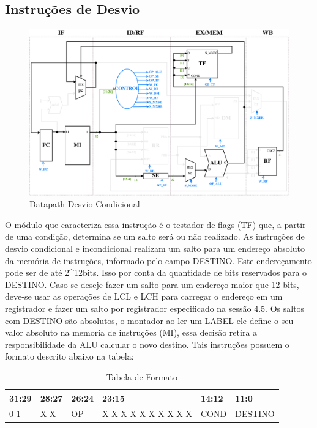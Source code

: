 \documentclass{report}
\begin{document}
\subsection{Instruções de Desvio}
\begin{figure}[H]
\centering
\includegraphics[width=\textwidth]{./pictures/DatapathDES.pdf}
\caption{Datapath Desvio Condicional}
\end{figure}
O módulo que caracteriza essa instrução é o testador de flags (TF) que, a partir de uma condição, determina se um salto será ou não realizado.
As instruções de desvio condicional e incondicional realizam um salto para um endereço absoluto da memória de instruções, informado pelo campo DESTINO. Este endereçamento pode ser de até 2\^{}12bits. Isso por conta da quantidade de bits reservados para o DESTINO. Caso se deseje fazer um salto para um endereço maior que 12 bits, deve-se usar as operações de LCL e LCH para carregar o endereço em um registrador e fazer um salto por registrador especificado na sessão 4.5.
Os saltos com DESTINO são absolutos, o montador ao ler um LABEL ele define o seu valor absoluto na memoria de instruções (MI), essa decisão retira a responsibilidade da ALU calcular o novo destino.
\newline
Tais instruções possuem o formato descrito abaixo na tabela:
\FloatBarrier
\begin{table}[H]
  \begin{center}
    \begin{tabular}[pos]{|>{\centering\arraybackslash}m{33pt}|>{\centering\arraybackslash}m{28pt}|>{\centering\arraybackslash}m{33pt}|>{\centering\arraybackslash}m{105pt}|>{\centering\arraybackslash}m{33pt}|>{\centering\arraybackslash}m{120pt}|} \hline
      \cellcolor[gray]{0.9}\textbf{31:29} & \cellcolor[gray]{0.9}\textbf{28:27} & \cellcolor[gray]{0.9}\textbf{26:24} & \cellcolor[gray]{0.9}\textbf{23:15} & \cellcolor[gray]{0.9}\textbf{14:12} & \cellcolor[gray]{0.9}\textbf{11:0} \\ \hline
        1 0 1       & X X       & OP        & X X X X X X X X X X      & COND       & DESTINO \\ \hline
    \end{tabular}
    \caption{Tabela de Formato}
  \end{center}
\end{table}  
\end{document}
